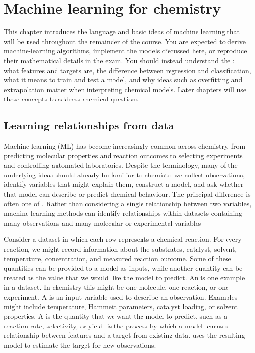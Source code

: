 
\chapter{Machine learning for chemistry}

\begin{notebox}
  This chapter introduces the language and basic ideas of machine learning that will be used throughout the remainder of the course.
  You are  expected to derive machine-learning algorithms, implement the models discussed here, or reproduce their mathematical details in the exam.
  You should instead understand the : what features and targets are, the difference between regression and classification, what it means to train and test a model, and why ideas such as overfitting and extrapolation matter when interpreting chemical models.
  Later chapters will use these concepts to address chemical questions.
\end{notebox}

\section{Learning relationships from data}

Machine learning (ML) has become increasingly common across chemistry, from predicting molecular properties and reaction outcomes to selecting experiments and controlling automated laboratories.
Despite the terminology, many of the underlying ideas should already be familiar to chemists: we collect observations, identify variables that might explain them, construct a model, and ask whether that model can describe or predict chemical behaviour.
The principal difference is often one of .
Rather than considering a single relationship between two variables, machine-learning methods can identify relationships within datasets containing many observations and many molecular or experimental variables

Consider a dataset in which each row represents a chemical reaction.
For every reaction, we might record information about the substrates, catalyst, solvent, temperature, concentration, and measured reaction outcome.
Some of these quantities can be provided to a model as inputs, while another quantity can be treated as the value that we would like the model to predict.
An  is one example in a dataset.
In chemistry this might be one molecule, one reaction, or one experiment.
A  is an input variable used to describe an observation.
Examples might include temperature, Hammett parameters, catalyst loading, or solvent properties.
A  is the quantity that we want the model to predict, such as a reaction rate, selectivity, or yield.
 is the process by which a model learns a relationship between features and a target from existing data.
 uses the resulting model to estimate the target for new observations.

